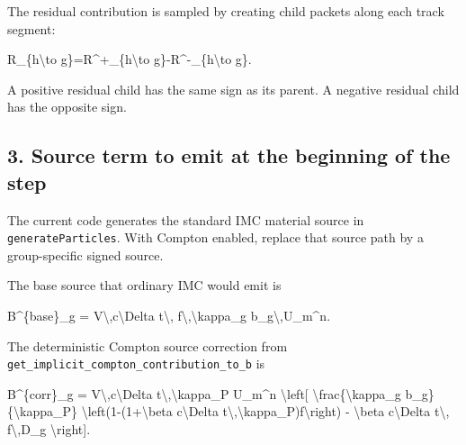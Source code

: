 \documentclass[
]{article}
\newenvironment{Shaded}{}{}
\newcommand{\NormalTok}[1]{#1}
\begin{document}
The residual contribution is sampled by creating child packets along
each track segment:

\begin{Shaded}
\begin{Highlighting}[]
\NormalTok{R\_\{h\textbackslash{}to g\}=R\^{}+\_\{h\textbackslash{}to g\}{-}R\^{}{-}\_\{h\textbackslash{}to g\}.}
\end{Highlighting}
\end{Shaded}

A positive residual child has the same sign as its parent. A negative
residual child has the opposite sign.

\subsection{3. Source term to emit at the beginning of the
step}\label{source-term-to-emit-at-the-beginning-of-the-step}

The current code generates the standard IMC material source in
\texttt{generateParticles}. With Compton enabled, replace that source
path by a group-specific signed source.

The base source that ordinary IMC would emit is

\begin{Shaded}
\begin{Highlighting}[]
\NormalTok{B\^{}\{base\}\_g = V\textbackslash{},c\textbackslash{}Delta t\textbackslash{}, f\textbackslash{},\textbackslash{}kappa\_g b\_g\textbackslash{},U\_m\^{}n.}
\end{Highlighting}
\end{Shaded}

The deterministic Compton source correction from
\texttt{get\_implicit\_compton\_contribution\_to\_b} is

\begin{Shaded}
\begin{Highlighting}[]
\NormalTok{B\^{}\{corr\}\_g}
\NormalTok{= V\textbackslash{},c\textbackslash{}Delta t\textbackslash{},\textbackslash{}kappa\_P U\_m\^{}n}
\NormalTok{  \textbackslash{}left[}
\NormalTok{    \textbackslash{}frac\{\textbackslash{}kappa\_g b\_g\}\{\textbackslash{}kappa\_P\}}
\NormalTok{       \textbackslash{}left(1{-}(1+\textbackslash{}beta c\textbackslash{}Delta t\textbackslash{},\textbackslash{}kappa\_P)f\textbackslash{}right)}
\NormalTok{    {-} \textbackslash{}beta c\textbackslash{}Delta t\textbackslash{}, f\textbackslash{},D\_g}
\NormalTok{  \textbackslash{}right].}
\end{Highlighting}
\end{Shaded}
\end{document}
